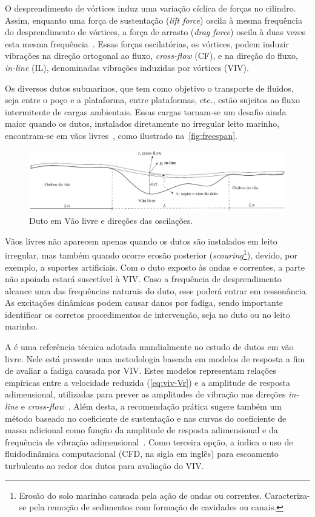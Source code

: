 O desprendimento de vórtices induz uma variação cíclica de forças no cilindro.
Assim, enquanto uma força de sustentação (\textit{lift force}) oscila à mesma frequência do desprendimento de vórtices, a força de arrasto (\textit{drag force}) oscila à duas vezes esta mesma frequência~\cite{Sumer1995}.
Essas forças oscilatórias, os vórtices, podem induzir vibrações na direção ortogonal ao fluxo, \textit{cross-flow} (CF), e na direção do fluxo, \textit{in-line} (IL), denominadas vibrações induzidas por vórtices (VIV).

Os diversos dutos submarinos, que tem como objetivo o transporte de fluidos, seja entre o poço e a plataforma, entre plataformas, etc., estão sujeitos ao fluxo intermitente de cargas ambientais.
Essas cargas tornam-se um desafio ainda maior quando os dutos, instalados diretamente no irregular leito marinho, encontram-se em vãos livres~\cite{Fyrileiv1998}, como ilustrado na~\autoref{fig:freespan}.

\begin{figure}[!ht]
	\centering
    \caption{Duto em Vão livre e direções das oscilações.}\label{fig:freespan}
	\includegraphics[width=1\textwidth]{imagens/freespan}
\end{figure}

Vãos livres não aparecem apenas quando os dutos são instalados em leito irregular, mas também quando ocorre erosão posterior (\textit{scouring}\footnote{Erosão do solo marinho causada pela ação de ondas ou correntes. Caracteriza-se pela remoção de sedimentos com formação de cavidades ou canais.}), devido, por exemplo, a suportes artificiais.
Com o duto exposto às ondas e correntes, a parte não apoiada estará suscetível à VIV.\@
Caso a frequência de desprendimento alcance uma das frequências naturais do duto, esse poderá entrar em ressonância.
As excitações dinâmicas podem causar danos por fadiga, sendo importante identificar os corretos procedimentos de intervenção, seja no duto ou no leito marinho.

A  é uma referência técnica adotada mundialmente no estudo de dutos em vão livre.
Nele está presente uma metodologia baseada em modelos de resposta a fim de avaliar a fadiga causada por VIV\@.
Estes modelos representam relações empíricas entre a velocidade reduzida (\autoref{eq:viv-Vr}) e a amplitude de resposta adimensional, utilizadas para prever as amplitudes de vibração nas direções \textit{in-line} e \textit{cross-flow}~\cite{Mork2003,DNV2017}.
Além desta, a recomendação prática sugere também um método baseado no coeficiente de sustentação e nas curvas do coeficiente de massa adicional como função da amplitude de resposta adimensional e da frequência de vibração adimensional~\cite{DNV2017}.
Como terceira opção, a  indica o uso de fluidodinâmica computacional (CFD, na sigla em inglês) para escoamento turbulento ao redor dos dutos para avaliação do VIV\@.

